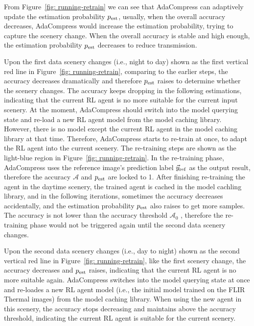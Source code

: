 From Figure~\ref{fig: running-retrain} we can see that AdaCompress can adaptively update the estimation probability $ p_{\rm est} $, usually, when the overall accuracy decreases, AdaCompress would increase the estimation probability, trying to capture the scenery change. When the overall accuracy is stable and high enough, the estimation probability $ p_{\rm est} $ decreases to reduce transmission. %

Upon the first data scenery changes (i.e., night to day) shown as the first vertical red line in Figure~\ref{fig: running-retrain}, comparing to the earlier steps, the accuracy decreases dramatically and therefore $ p_{\rm est} $ raises to determine whether the scenery changes. The accuracy keeps dropping in the following estimations, indicating that the current RL agent is no more suitable for the current input scenery. At the moment, AdaCompress should switch into the model querying state and re-load a new RL agent model from the model caching library. However, there is no model except the current RL agent in the model caching library at that time. Therefore, AdaCompress starts to re-train at once, to adapt the RL agent into the current scenery. The re-training steps are shown as the light-blue region in Figure~\ref{fig: running-retrain}. In the re-training phase, AdaCompress uses the reference image's prediction label $ \vec{y}_{\rm ref} $ as the output result, therefore the accuracy $ \mathcal{A} $ and $ p_{\rm est} $ are locked to 1. After finishing re-training the agent in the daytime scenery, the trained agent is cached in the model cachling library, and in the following iterations, sometimes the accuracy decreases accidentally, and the estimation probability $ p_{\rm est} $ also raises to get more samples. The accuracy is not lower than the accuracy threshold $ \mathcal{A}_0 $ , therefore the re-training phase would not be triggered again until the second data scenery changes. %

Upon the second data scenery changes (i.e., day to night) shown as the second vertical red line in Figure~\ref{fig: running-retrain}, like the first scenery change, the accuracy decreases and $ p_{\rm est} $ raises, indicating that the current RL agent is no more suitable again. AdaCompress switches into the model querying state at once and re-loades a new RL agent model (i.e., the initial model trained on the FLIR Thermal images) from the model caching library. When using the new agent in this scenery, the accuracy stops decreasing and maintains above the accuracy threshold, indicating the current RL agent is suitable for the current scenery.  %

